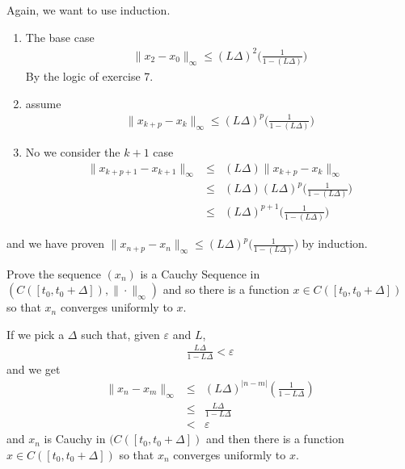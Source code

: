 \documentclass[11pt]{SelfArxOneColBMN}
\begin{document}
\begin{solution}
Again, we want to use induction.
\begin{enumerate}
  \item The base case
  \begin{eqnarray*}
    \|x_{2} - x_0\|_\infty \leq (L \Delta)^2  \biggl ( \frac{1}{1 - (L \Delta)} \biggr) 
  \end{eqnarray*}
  By the logic of exercise 7.
  \item assume
  \begin{eqnarray*}
    \|x_{k+p} - x_k\|_\infty \leq (L \Delta)^p  \biggl ( \frac{1}{1 - (L \Delta)} \biggr)
  \end{eqnarray*}
  \item No we consider the $k + 1$ case
  \begin{eqnarray*}
    \|x_{k+p + 1} - x_{k + 1}\|_\infty &\leq& (L \Delta)  \biggl \|x_{k + p} - x_k\|_\infty\\
    &\leq& (L \Delta) (L \Delta)^p  \biggl ( \frac{1}{1 - (L \Delta)} \biggr)\\
    &\leq& (L \Delta)^{p+1}  \biggl ( \frac{1}{1 - (L \Delta)} \biggr)
  \end{eqnarray*}
\end{enumerate}
and we have proven $\|x_{n+p} - x_n\|_\infty \leq (L \Delta)^p  \biggl ( \frac{1}{1 - (L \Delta)} \biggr)$ by induction.
\end{solution}

\begin{exercise}
Prove the sequence $(x_n)$ is a Cauchy Sequence in $(C([t_0,t_0+\Delta]), \| \cdot \|_\infty)$
and so there is a function $x \in C([t_0,t_0+\Delta])$ so that $x_n$ converges
uniformly to $x$.
\end{exercise}

\begin{solution}
If we pick a $\Delta$ such that, given $\varepsilon$ and $L$,
\begin{eqnarray*}
  \frac{L\Delta}{1 - L\Delta} < \varepsilon
\end{eqnarray*}
and we get
\begin{eqnarray*}
  \|x_n - x_m\|_\infty &\leq& (L\Delta)^{|n - m|}(\frac{1}{1 - L\Delta})\\
  &\leq& \frac{L\Delta}{1 - L\Delta}\\
  &<& \varepsilon
\end{eqnarray*}
and $x_n$ is Cauchy in $(C([t_0,t_0+\Delta])$ and then there is a function $x \in C([t_0,t_0+\Delta])$ so that $x_n$ converges
uniformly to $x$.
\end{solution}
\end{document}
